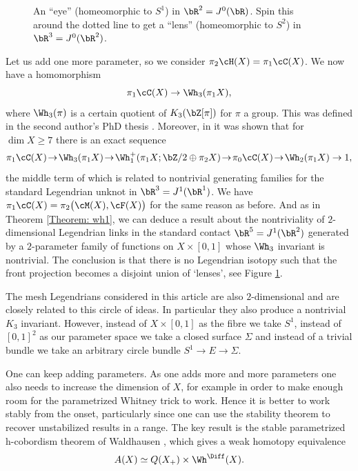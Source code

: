 \begin{figure}[htbp]
\begin{center}
\caption{\smaller An ``eye'' (homeomorphic to $S^1$) in $\bR^2=J^0(\bR)$. Spin this around the dotted line to get a ``lens'' (homeomorphic to $S^2$) in $\bR^3=J^0(\bR^2)$. }
\label{Fig: eye}
\end{center}
\end{figure}
%

Let us add one more parameter, so we consider $\pi_2 \cH(X) = \pi_1 \cC(X)$. We now have a homomorphism
\[ \pi_1\cC(X) \to \Wh_3( \pi_1X ), \]
where $\Wh_3(\pi)$ is a certain quotient of $K_3(\bZ[\pi])$ for $\pi$ a group. This was defined in the second author's PhD thesis \cite{I79}. Moreover, in \cite{I82} it was shown that for $\dim X \geq 7$ there is an exact sequence
\[ \pi_1 \cC(X) \!\to\! \Wh_3(\pi_1 X) \!\to\! \Wh^+_1(\pi_1X ; \bZ/2 \oplus \pi_2 X) \!\to\! \pi_0 \cC(X) \!\to\! \Wh_2(\pi_1 X) \rightarrow 1, \]
the middle term of which is related to nontrivial generating families for the standard Legendrian unknot in $\bR^3=J^1(\bR^1)$. We have $ \pi_1\cC(X) = \pi_2\big( \cM(X), \cF(X) \big)$ for the same reason as before. And as in Theorem \ref{Theorem: wh1}, we can deduce a result about the nontriviality of $2$-dimensional Legendrian links in the standard contact $\bR^5=J^1(\bR^2)$ generated by a $2$-parameter family of functions on $X \times [0,1]$ whose $\Wh_3$ invariant is nontrivial. The conclusion is that there is no Legendrian isotopy such that the front projection becomes a disjoint union of `lenses', see Figure \ref{Fig: eye}.

The mesh Legendrians considered in this article are also $2$-dimensional and are closely related to this circle of ideas. In particular they also produce a nontrivial $K_3$ invariant. However, instead of $X \times [0,1]$ as the fibre we take $S^1$, instead of $[0,1]^2$ as our parameter space we take a closed surface $\Sigma$ and instead of a trivial bundle we take an arbitrary circle bundle $S^1 \to E \to \Sigma$.

One can keep adding parameters. As one adds more and more parameters one also needs to increase the dimension of $X$, for example in order to make enough room for the parametrized Whitney trick to work. Hence it is better to work stably from the onset, particularly since one can use the stability theorem \cite{I88} to recover unstabilized results in a range. The key result is the stable parametrized h-cobordism theorem of Waldhausen \cite{W82}, which gives a weak homotopy equivalence
\[ A(X) \simeq Q(X_+) \times \Wh^{\Diff}(X). \]

